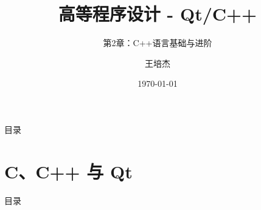 \documentclass[UTF8,aspectratio=169]{beamer}
\title{高等程序设计 - Qt/C++}
\subtitle{第2章：C++语言基础与进阶}
\author{王培杰}
\institute{长江大学地球物理与石油资源学院}
\date{\today}
\begin{document}
\begin{frame}
    \titlepage
\end{frame}

\begin{frame}{目录}
    \begin{multicols}{2}
        \tableofcontents[]
    \end{multicols}
\end{frame}

\section{C、C++ 与 Qt}
\begin{frame}{目录}
    \begin{multicols}{2}
        \tableofcontents[currentsection]
    \end{multicols}
\end{frame}
\end{document}
